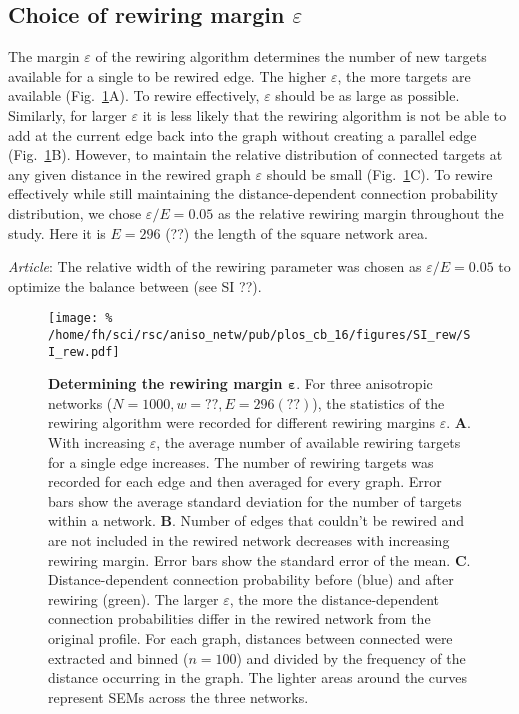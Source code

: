
\subsection*{Choice of rewiring margin $\varepsilon$}

The margin $\varepsilon$ of the rewiring algorithm determines the number of new targets available for a single to be rewired edge. The higher $\varepsilon$, the more targets are available (Fig.~\ref{fig:rew-ddcp-ef}A). To rewire effectively, $\varepsilon$ should be as large as possible. Similarly, for larger $\varepsilon$ it is less likely that the rewiring algorithm is not be able to add at the current edge back into the graph without creating a parallel edge (Fig.~\ref{fig:rew-ddcp-ef}B). However, to maintain the relative distribution of connected targets at any given distance in the rewired graph $\varepsilon$ should be small (Fig.~\ref{fig:rew-ddcp-ef}C). To rewire effectively while still maintaining the distance-dependent connection probability distribution, we chose $\varepsilon/E = 0.05$ as the relative rewiring margin throughout the study. Here it is $E=296$ (??) the length of the square network area.



\textit{Article}: The relative width of the rewiring parameter was chosen as $\varepsilon / E = 0.05$ to optimize the balance between (see SI ??).


\begin{figure}[h!]
  \texttt{[image: \%
    /home/fh/sci/rsc/aniso\_netw/pub/plos\_cb\_16/figures/SI\_rew/SI\_rew.pdf]}
  \caption{\textbf{Determining the rewiring margin $\bm{\varepsilon}$}. For three anisotropic networks ($N=1000, w=??, E= 296 (??)$), the statistics of the rewiring algorithm were recorded for different rewiring margins $\varepsilon$.
    \textbf{A}. With increasing $\varepsilon$, the average number of available rewiring targets for a single edge increases. The number of rewiring targets was recorded for each edge and then averaged for every graph. Error bars show the average standard deviation for the number of targets within a network.
    \textbf{B}. Number of edges that couldn't be rewired and are not included in the rewired network decreases with increasing rewiring margin. Error bars show the standard error of the mean. \textbf{C}. Distance-dependent connection probability before (blue) and after rewiring (green). The larger $\varepsilon$, the more the distance-dependent connection probabilities differ in the rewired network from the original profile. For each graph, distances between connected were extracted and binned ($n=100$) and divided by the frequency of the distance occurring in the graph. The lighter areas around the curves represent SEMs across the three networks.}
  \label{fig:rew-ddcp-ef}
\end{figure}
